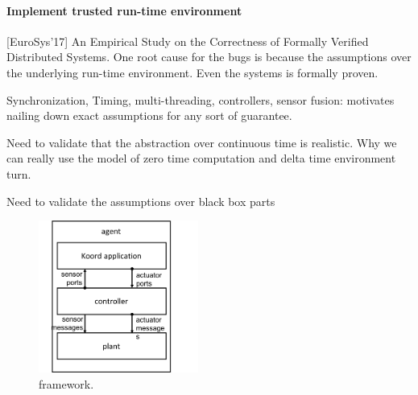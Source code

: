 \paragraph{Implement trusted run-time environment}


[EuroSys'17] An Empirical Study on the Correctness of Formally Verified Distributed Systems.
One root cause for the bugs is because the assumptions over the underlying run-time environment. Even the systems is formally proven.

Synchronization, Timing, multi-threading, controllers, sensor fusion:
motivates nailing down exact assumptions for any sort of guarantee.

Need to validate that the abstraction over continuous time is realistic.
Why we can really use the model of zero time computation and delta time environment turn.

Need to validate the assumptions over black box parts


\begin{figure}[h!]
\centering
\includegraphics[height=5cm]{figs/arch.png}
\caption{\toolname framework.}
\label{fig:arch}
\end{figure}

